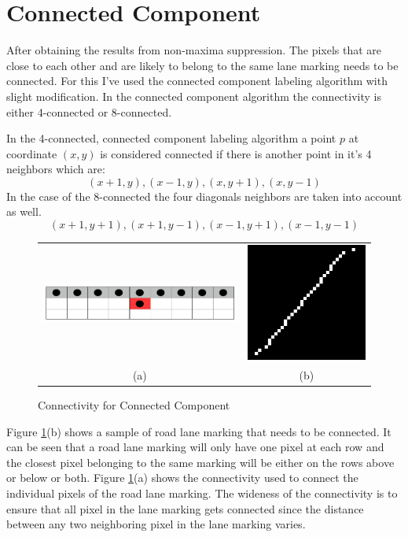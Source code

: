 \section{Connected Component}
After obtaining the results from non-maxima suppression. The pixels that are
close to each other and are likely to belong to the same lane marking needs to
be connected. For this I've used the connected component labeling algorithm 
 with slight modification. In the connected 
component algorithm the connectivity is either 4-connected or 8-connected. 

In the 4-connected, connected component labeling algorithm a point $p$ at 
coordinate $(x,y)$ is considered connected if there is another point in it's 4 
neighbors which are:
$$(x+1, y),  (x-1, y), (x, y+1), (x, y-1)$$ 
In the case of the 8-connected the four diagonals neighbors are taken into account as well.
$$(x+1, y+1), (x+1, y-1), (x-1, y+1), (x-1, y-1)$$ 
 
 
\begin{figure}
 \centering
 \begin{tabular}{c c}
   \includegraphics[width=100mm]{figures/connected_component1.png} &
   \includegraphics[width=60mm]{figures/pixel_for_connected_component.png} \\
   (a) & (b) \\
 \end{tabular}
 \caption{Connectivity for Connected Component}
 \label{fig:connected_component}
\end{figure}
 
Figure \ref{fig:connected_component}(b) shows a sample of road lane marking that 
needs to be connected. It can be seen that a road lane marking will only have 
one pixel at each row and the closest pixel belonging to the same marking will 
be either on the rows above or below or both. Figure 
\ref{fig:connected_component}(a) shows the connectivity used to connect the 
individual pixels of the road lane marking. The wideness of the connectivity is 
to ensure that all pixel in the lane marking gets connected since the distance 
between any two neighboring pixel in the lane marking varies. 

